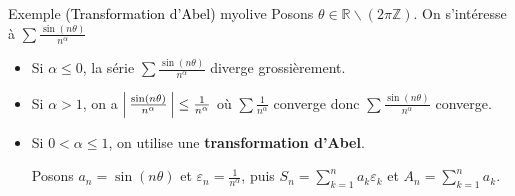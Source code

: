     \begin{omed}{Exemple \textcolor{black}{(Transformation d’Abel)} }{myolive}
        Posons $\theta \in \mathbb{R} \backslash \left(2 \pi \mathbb{Z}\right)$. On s’intéresse à $\sum \frac{\sin(n\theta)}{n^{\alpha}}$ 
        \begin{itemize}
            \item Si $\alpha \leq 0$, la série $\sum \frac{\sin(n\theta)}{n^{\alpha}}$ diverge grossièrement. 
            \item Si $\alpha > 1$, on a $\left\lvert \,\frac{\sin(n\theta)}{n^{\alpha}} \, \right\rvert \leq \frac{1}{n^{\alpha}}$ où $\sum \frac{1}{n^{\alpha}}$ converge donc $\sum \frac{\sin(n\theta)}{n^{\alpha}}$ converge.
            \item Si $0 < \alpha \leq 1$, on utilise une \textbf{transformation d’Abel}. 
            
            Posons $a_n = \sin(n \theta)$ et $\varepsilon_n = \frac{1}{n^{\alpha}}$, puis $S_n = \sum_{k=1}^{n} a_k \varepsilon_k$ et $A_n = \sum_{k=1}^{n} a_k$.
    

\end{itemize}
\end{omed}
